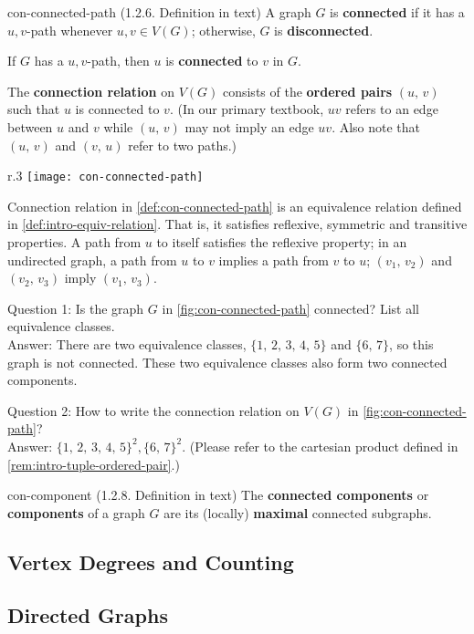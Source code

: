 \documentclass[../src/handouts/main.tex]{subfiles}
\begin{document}
\begin{definition}{}{con-connected-path}
  (1.2.6. Definition in text)
  A graph $G$ is \textbf{connected} if it has a $u,v$-path whenever $u,v \in V(G)$; otherwise, $G$ is \textbf{disconnected}.

  If $G$ has a $u,v$-path, then $u$ is \textbf{connected} to $v$ in $G$.

  The \textbf{connection relation} on $V(G)$ consists of the \textbf{ordered pairs} $(u,\, v)$ such that $u$ is connected to $v$. (In our primary textbook, $uv$ refers to an edge between $u$ and $v$ while $(u,\, v)$ may not imply an edge $uv$. Also note that $(u,\, v)$ and $(v,\, u)$ refer to two paths.)
\end{definition}

\begin{wrapfigure}{r}{.3\textwidth}
  \centering
  \texttt{[image: con-connected-path]}
  \caption{A graph $G$ for the illustration of connection relation.}
  \label{fig:con-connected-path}
\end{wrapfigure}

Connection relation in \cref{def:con-connected-path} is an equivalence relation defined in \cref{def:intro-equiv-relation}. That is, it satisfies reflexive, symmetric and transitive properties. A path from $u$ to itself satisfies the reflexive property; in an undirected graph, a path from $u$ to $v$ implies a path from $v$ to $u$; $(v_1,\, v_2)$ and $(v_2,\, v_3)$ imply $(v_1,\, v_3)$.

Question 1: Is the graph $G$ in \cref{fig:con-connected-path} connected? List all equivalence classes.\\
Answer: There are two equivalence classes, $\{1,\, 2,\, 3,\, 4,\, 5\}$ and $\{6,\, 7\}$, so this graph is not connected. These two equivalence classes also form two connected components.

Question 2: How to write the connection relation on $V(G)$ in \cref{fig:con-connected-path}?\\
Answer: $\{ 1,\, 2,\, 3,\, 4,\, 5 \}^2, \{ 6,\, 7 \}^2$. (Please refer to the cartesian product defined in \cref{rem:intro-tuple-ordered-pair}.)

\begin{definition}{}{con-component}
  (1.2.8. Definition in text)
  The \textbf{connected components} or \textbf{components} of a graph $G$ are its (locally) \textbf{maximal} connected subgraphs.
\end{definition}

\subsection{Vertex Degrees and Counting}


\subsection{Directed Graphs}
\end{document}
